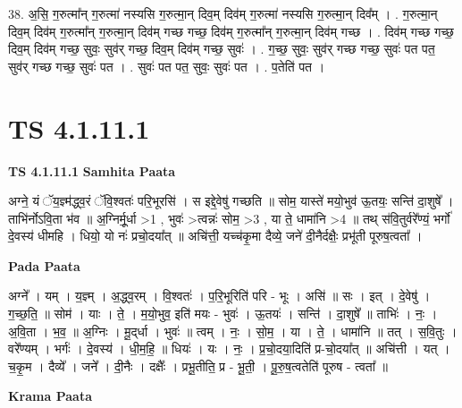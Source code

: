 \documentclass[17pt]{extarticle}
\begin{document}
38. अ॒सि॒ ग॒रुत्मा᳚न् ग॒रुत्मा॑ नस्यसि ग॒रुत्मा॒न् दिव॒म् दिव॑म् ग॒रुत्मा॑ नस्यसि ग॒रुत्मा॒न् दिव᳚म् । . ग॒रुत्मा॒न् दिव॒म् दिव॑म् ग॒रुत्मा᳚न् ग॒रुत्मा॒न् दिव॑म् गच्छ गच्छ॒ दिव॑म् ग॒रुत्मा᳚न् ग॒रुत्मा॒न् दिव॑म् गच्छ । . दिव॑म् गच्छ गच्छ॒ दिव॒म् दिव॑म् गच्छ॒ सुवः॒ सुव॑र् गच्छ॒ दिव॒म् दिव॑म् गच्छ॒ सुवः॑ । . ग॒च्छ॒ सुवः॒ सुव॑र् गच्छ गच्छ॒ सुवः॑ पत पत॒ सुव॑र् गच्छ गच्छ॒ सुवः॑ पत । . सुवः॑ पत पत॒ सुवः॒ सुवः॑ पत । . प॒तेति॑ पत । \newline
\pagebreak
{}

\section{ TS 4.1.11.1 }

\textbf{TS 4.1.11.1 } \newline
\textbf{Samhita Paata} \newline

अग्ने॒ यं ॅय॒ज्ञ्म॑द्ध्व॒रं ॅवि॒श्वतः॑ परि॒भूरसि॑ । स इद्दे॒वेषु॑ गच्छति ॥ सोम॒ यास्ते॑ मयो॒भुव॑ ऊ॒तयः॒ सन्ति॑ दा॒शुषे᳚ । ताभि॑र्नोऽवि॒ता भ॑व ॥ अ॒ग्निर्मू॒र्धा >1 , भुवः॑ >त्वन्नः॑ सोम॒ >3 , या ते॒ धामा॑नि >4 ॥ तथ् स॑वि॒तुर्वरे᳚ण्यं॒ भर्गो॑ दे॒वस्य॑ धीमहि । धियो॒ यो नः॑ प्रचो॒दया᳚त् ॥ अचि॑त्ती॒ यच्च॑कृ॒मा दैव्ये॒ जने॑ दी॒नैर्दक्षैः॒ प्रभू॑ती पूरुष॒त्वता᳚ । \newline

\textbf{Pada Paata} \newline

अग्ने᳚ । यम् । य॒ज्ञ्म् । अ॒द्ध्व॒रम् । वि॒श्वतः॑ । प॒रि॒भूरिति॑ परि - भूः । असि॑ ॥ सः । इत् । दे॒वेषु॑ । ग॒च्छ॒ति॒ ॥ सोम॑ । याः । ते॒ । म॒यो॒भुव॒ इति॑ मयः - भुवः॑ । ऊ॒तयः॑ । सन्ति॑ । दा॒शुषे᳚ ॥ ताभिः॑ । नः॒ । अ॒वि॒ता । भ॒व॒ ॥ अ॒ग्निः । मू॒द्‌र्धा । भुवः॑ ॥ त्वम् । नः॒ । सो॒म॒ । या । ते॒ । धामा॑नि ॥ तत् । स॒वि॒तुः । वरे᳚ण्यम् । भर्गः॑ । दे॒वस्य॑ । धी॒म॒हि॒ ॥ धियः॑ । यः । नः॒ । प्र॒चो॒दया॒दिति॑ प्र-चो॒दया᳚त् ॥ अचि॑त्ती । यत् । च॒कृ॒म । दैव्ये᳚ । जने᳚ । दी॒नैः । दक्षैः᳚ । प्रभू॒तीति॒ प्र - भू॒ती॒ । पू॒रु॒ष॒त्वतेति॑ पूरुष - त्वता᳚ ॥  \newline


\textbf{Krama Paata} \newline
\end{document}
